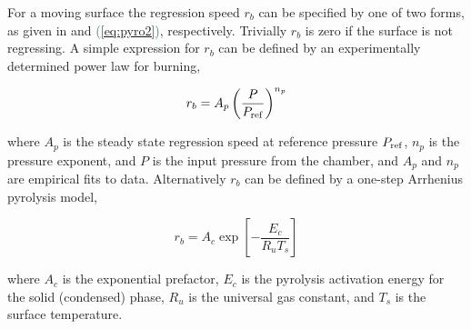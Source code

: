 
For a moving surface the regression speed $r_b$ can be specified by one of two forms, as given in  and \textcolor{teal}{(\ref{eq:pyro2})}, respectively. Trivially $r_b$ is zero if the surface is not regressing. A simple expression for $r_b$ can be defined by an experimentally determined power law for burning, 

\begin{equation}
r_b = A_p \left( \frac{P}{P_{\rm ref}} \right)^{n_p} 
\label{eq:pyro1}
\end{equation}

where $A_p$ is the steady state regression speed at reference pressure $P_{\rm ref}$, $n_p$ is the pressure exponent, and $P$ is the input pressure from the chamber, and $A_p$ and $n_p$ are empirical fits to data. Alternatively $r_b$  can be defined by a one-step Arrhenius pyrolysis model,

\begin{equation}
r_b = A_c \exp\left[ -\frac{E_c}{R_u T_s} \right] 
\label{eq:pyro2}
\end{equation}

where $A_c$ is the exponential prefactor, $E_c$ is the pyrolysis activation energy for the solid (condensed) phase, $R_u$ is the universal gas constant, and $T_s$ is the surface temperature.